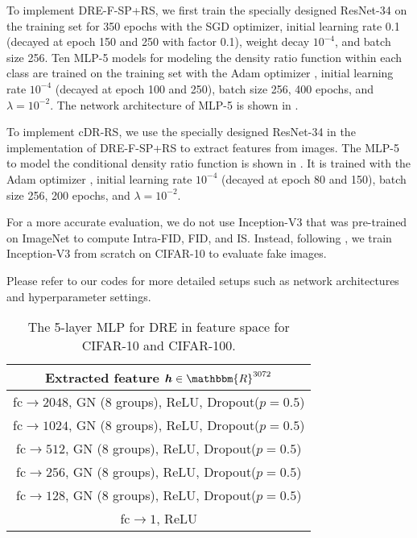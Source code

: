 \documentclass[final,12pt, 3p,times]{elsarticle}
\begin{document}
To implement DRE-F-SP+RS, we first train the specially designed ResNet-34 on the training set for 350 epochs with the SGD optimizer, initial learning rate 0.1 (decayed at epoch 150 and 250 with factor 0.1), weight decay $10^{-4}$, and batch size 256. Ten MLP-5 models for modeling the density ratio function within each class are trained on the training set with the Adam optimizer \cite{kingma2014adam}, initial learning rate $10^{-4}$ (decayed at epoch 100 and 250), batch size 256, 400 epochs, and $\lambda=10^{-2}$. The network architecture of MLP-5 is shown in . 

To implement cDR-RS, we use the specially designed ResNet-34 in the implementation of DRE-F-SP+RS to extract features from images. The MLP-5 to model the conditional density ratio function is shown in . It is trained with the Adam optimizer \cite{kingma2014adam}, initial learning rate $10^{-4}$ (decayed at epoch 80 and 150), batch size 256, 200 epochs, and $\lambda=10^{-2}$.

For a more accurate evaluation, we do not use Inception-V3 \cite{szegedy2016rethinking} that was pre-trained on ImageNet \cite{imagenet_cvpr09} to compute Intra-FID, FID, and IS. Instead, following \cite{ding2020subsampling}, we train Inception-V3 from scratch on CIFAR-10 to evaluate fake images. 

Please refer to our codes for more detailed setups such as network architectures and hyperparameter settings.

\begin{table}[h]
	\centering
	\caption{The 5-layer MLP for DRE in feature space for CIFAR-10 and CIFAR-100.}
\begin{tabular}{c}
			\toprule
			Extracted feature $\bm{h}\in \mathbbm{R}^{3072}$ \\
			\hline
			fc$\rightarrow 2048$, GN (8 groups), ReLU, Dropout($p=0.5$) \\\hline
			fc$\rightarrow 1024$, GN (8 groups), ReLU, Dropout($p=0.5$) \\\hline
			fc$\rightarrow 512$, GN (8 groups), ReLU, Dropout($p=0.5$) \\\hline
			fc$\rightarrow 256$, GN (8 groups), ReLU, Dropout($p=0.5$) \\\hline
			fc$\rightarrow 128$, GN (8 groups), ReLU, Dropout($p=0.5$) \\\hline
			fc$\rightarrow 1$, ReLU \\
			\bottomrule
		\end{tabular}\label{tab:cifar10_MLP5}\end{table}
\end{document}

